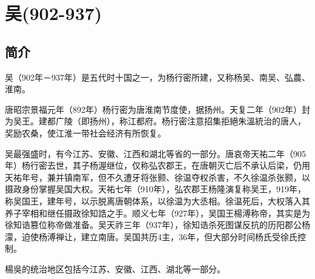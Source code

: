 

\section{吴\tiny(902-937)}

\subsection{简介}

吴（902年－937年）是五代时十国之一，为杨行密所建，又称杨吴、南吴、弘農、淮南。

唐昭宗景福元年（892年）杨行密为唐淮南节度使，据扬州。天复二年（902年）封为吴王。建都广陵（即扬州），称江都府。杨行密注意招集拒絕朱溫統治的唐人，奖励农桑，使江淮一带社会经济有所恢复。

吴最强盛时，有今江苏、安徽、江西和湖北等省的一部分。唐哀帝天祐二年（905年）杨行密去世，其子杨渥继位，仅称弘农郡王，在唐朝灭亡后不承认后梁，仍用天祐年号，兼并镇南军，但不久遭牙将张颢、徐温夺权杀害，不久徐温杀张颢，以摄政身份掌握吴国大权。天祐七年（910年），弘农郡王杨隆演复称吴王，919年，称吴国王，建年号，以示脱离唐朝体系，以徐温为大丞相。徐温死后，大权落入其养子宰相和继任摄政徐知誥之手。顺义七年（927年），吴国王楊溥称帝，其实是为徐知诰篡位称帝做准备。吴天祚三年（937年），徐知诰杀死图谋反抗的历阳郡公杨濛，迫使杨溥禅让，建立南唐。吴国共历4主，36年，但大部分时间杨氏受徐氏控制。

楊吳的统治地区包括今江苏、安徽、江西、湖北等一部分。







